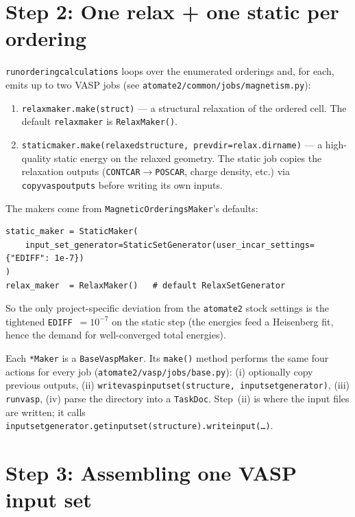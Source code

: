 \documentclass[11pt]{article}
\newcommand{\code}[1]{\texttt{\def\_{\textunderscore\allowbreak}#1}}
\begin{document}
\section{Step 2: One relax + one static per ordering}

\code{run\_ordering\_calculations} loops over the enumerated orderings and, for
each, emits up to two VASP jobs (see \code{atomate2/common/jobs/magnetism.py}):

\begin{enumerate}
  \item \code{relax\_maker.make(struct)} --- a structural relaxation of the
        ordered cell. The default \code{relax\_maker} is \code{RelaxMaker()}.
  \item \code{static\_maker.make(relaxed\_structure, prev\_dir=relax.dir\_name)}
        --- a high-quality static energy on the relaxed geometry. The static job
        copies the relaxation outputs (\code{CONTCAR}$\to$\code{POSCAR}, charge
        density, etc.) via \code{copy\_vasp\_outputs} before writing its own
        inputs.
\end{enumerate}

The makers come from \code{MagneticOrderingsMaker}'s defaults:

\begin{lstlisting}
static_maker = StaticMaker(
    input_set_generator=StaticSetGenerator(user_incar_settings={"EDIFF": 1e-7})
)
relax_maker  = RelaxMaker()   # default RelaxSetGenerator
\end{lstlisting}

\noindent So the only project-specific deviation from the \code{atomate2} stock
settings is the tightened \code{EDIFF}~$=10^{-7}$ on the static step (the
energies feed a Heisenberg fit, hence the demand for well-converged total
energies).

Each \code{*Maker} is a \code{BaseVaspMaker}. Its \code{make()} method performs
the same four actions for every job
(\code{atomate2/vasp/jobs/base.py}): (i) optionally copy previous outputs,
(ii) \code{write\_vasp\_input\_set(structure, input\_set\_generator)},
(iii) \code{run\_vasp}, (iv) parse the directory into a \code{TaskDoc}. Step~(ii)
is where the input files are written; it calls
\code{input\_set\_generator.get\_input\_set(structure).write\_input(\dots)}.

\section{Step 3: Assembling one VASP input set}
\end{document}
